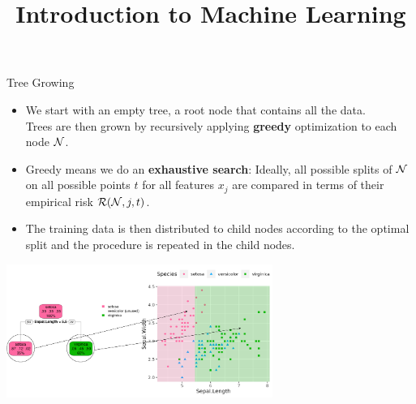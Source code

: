 \documentclass[11pt,compress,t,notes=noshow, xcolor=table]{beamer}
\title{Introduction to Machine Learning}
\begin{document}

\begin{vbframe}{Tree Growing}

\begin{itemize}

\item We start with an empty tree, a root node that contains all the data.\\
Trees are then grown by recursively applying \textbf{greedy} optimization to each node $\mathcal{N}$.

\item Greedy means we do an \textbf{exhaustive search}: Ideally, all possible splits of $\mathcal{N}$ on all possible points $t$ for all features $x_j$ are compared in terms of their empirical risk $\mathcal{R}(\mathcal{N}, j, t)$. 

\item The training data is then distributed to child nodes according to the optimal split and the procedure is repeated in the child nodes.

\end{itemize}

\color{fgcolor}

{\centering \includegraphics[width=0.65\textwidth]{figure/tree-classif-depth1-ann.pdf} 

}

\end{vbframe}
\end{document}
